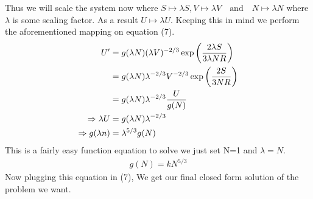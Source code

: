     Thus we will scale the system now where 
    \(S\mapsto \lambda S, V \mapsto \lambda V \quad \text{and} \quad N\mapsto \lambda N \) where 
   \(\lambda\) is some scaling factor. As a result \(U\mapsto \lambda U\). Keeping this in mind we 
   perform the aforementioned mapping on equation (7).
   \begin{align*}
       U' &= g(\lambda N)(\lambda V)^{-2/3}\exp\qty(\frac{2 \lambda S}{3 \lambda NR}) \\ 
          & = g(\lambda N) \lambda^{-2/3} V^{-2/3}\exp\qty(\frac{2S}{3NR}) \\ 
          & = g(\lambda N) \lambda^{-2/3} \frac{U}{g(N)} \\ 
       \Rightarrow \lambda U &=  g(\lambda N) \lambda^{-2/3} \\ 
       \Rightarrow g(\lambda n) &= \lambda^{5/3}g(N)
   \end{align*}
   This is a fairly easy function equation to solve we just set N=1 and \(\lambda = N\). 
   \begin{align}
       \tag{where k is some constant}
       g(N) = kN^{5/3}
   \end{align}
   Now plugging this equation in (7), We get our final closed form solution of the problem we want.\\
   \begin{center}
       \large
   \end{center}
   {\hfill \blacksquare}

